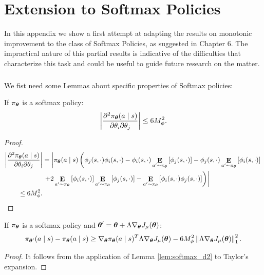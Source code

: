 \chapter{Extension to Softmax Policies}\label{app:softmax}

In this appendix we show a first attempt at adapting the results on monotonic improvement to the class of Softmax Policies, as suggested in Chapter 6. The impractical nature of this partial results is indicative of the difficulties that characterize this task and could be useful to guide future research on the matter.
\paragraph{}
We fist need some Lemmas about specific properties of Softmax policies:

\begin{lemma}\label{lem:softmax_d2}
If $\pi_{\vtheta}$ is a softmax policy:
\[
\left| \frac{\partial^2\pi_{\vtheta}(a \mid s)}
	{\partial\theta_i\partial\theta_j}\right| \leq
	6M_{\phi}^2.
\]
\end{lemma}
\begin{proof}
\begin{align*}
\left|\frac{\partial^2\pi_{\vtheta}(a \mid s)}
		{\partial\theta_i\partial\theta_j}\right|
		&= \left| \pi_{\vtheta}(a\mid s)\left(
		\phi_j(s,\cdot)\phi_i(s,\cdot) -  \phi_i(s,\cdot)\expected{a'}{\pi_{\vtheta}}{\phi_j(s,\cdot)} - \phi_j(s,\cdot)\expected{a'}{\pi_{\vtheta}}{\phi_i(s,\cdot)}\right.\right. \\
		&\left.\left.+ 2\expected{a'}{\pi_{\vtheta}}{\phi_i(s,\cdot)}\expected{a'}{\pi_{\vtheta}}{\phi_j(s,\cdot)} - \expected{a'}{\pi_{\vtheta}}{\phi_i(s,\cdot)\phi_j(s,\cdot)}\right)\right| \\
		\leq 6M_\phi^2.
\end{align*}
\end{proof}

\begin{lemma}\label{lem:softmax_diff}
If $\pi_{\vtheta}$ is a softmax policy and $\vtheta' = \vtheta+\Lambda\gradJ{\vtheta}$:
\[
\pi_{\vtheta'}(a \mid s) - \pi_{\vtheta}(a \mid s) \geq 
	\nabla_{\vtheta}\pi_{\vtheta}(a \mid s)^T\Lambda\gradJ{\vtheta} -
	6M_{\phi}^2\norm[1]{\Lambda\gradJ{\vtheta}}^2.
\]
\end{lemma}
\begin{proof}
It follows from the application of Lemma \ref{lem:softmax_d2} to Taylor's expansion.
\end{proof}

